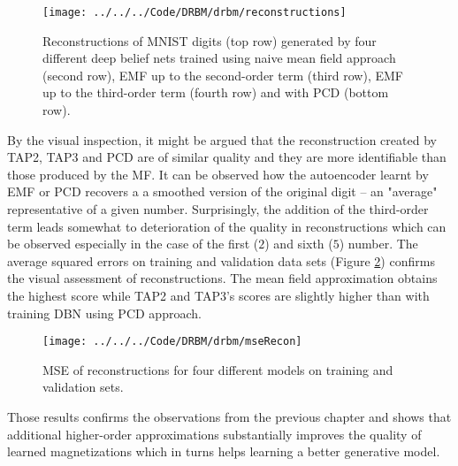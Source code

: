 \begin{figure}[!htb]
\texttt{[image: ../../../Code/DRBM/drbm/reconstructions]}
  \caption[Reconstructions of digits with deep structures]{Reconstructions of MNIST digits (top row) generated by four different deep belief nets trained using naive mean field approach (second row), EMF up to the second-order term (third row), EMF up to the third-order term (fourth row) and with PCD (bottom row).}
\label{fig:drbm}
\end{figure}
  
By the visual inspection, it might be argued that the reconstruction created by TAP2, TAP3 and PCD are of similar quality and they are more identifiable than those produced by the MF. 
It can be observed how the autoencoder learnt by EMF or PCD recovers a a smoothed version of the original digit -- an "average" representative of a given number. Surprisingly, the addition of the third-order term leads somewhat to deterioration of the quality in reconstructions which can be observed especially in the case of the first ($2$) and sixth ($5$) number. 
The average squared errors on training and validation data sets (Figure \ref{fig:mse}) confirms the visual assessment of reconstructions. The mean field approximation obtains the highest score while TAP2 and TAP3's scores are slightly higher than with training DBN using PCD approach. 

\begin{figure}[!htb]
\begin{center}
\texttt{[image: ../../../Code/DRBM/drbm/mseRecon]}
\end{center}
  \caption[1]{MSE of reconstructions for four different models on training and validation sets.}
\label{fig:mse}
\end{figure}

Those results confirms the observations from the previous chapter and shows that additional higher-order approximations substantially improves the quality of learned magnetizations which in turns helps learning a better generative model.


